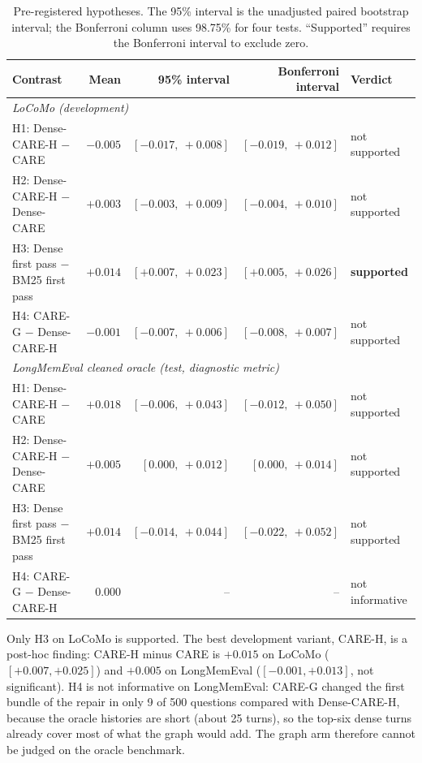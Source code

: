 \documentclass[10pt]{article}
\theoremstyle{plain}
\begin{document}
\begin{table}[t]
\centering
\caption{Pre-registered hypotheses. The 95\% interval is the unadjusted paired bootstrap interval; the Bonferroni
column uses 98.75\% for four tests. ``Supported'' requires the Bonferroni interval to exclude zero.}
\label{tab:hyp}
\small
\begin{tabular}{lrrrl}
\toprule
Contrast & Mean & 95\% interval & Bonferroni interval & Verdict \\
\midrule
\multicolumn{5}{l}{\emph{LoCoMo (development)}} \\
H1: Dense-CARE-H $-$ CARE & $-0.005$ & $[-0.017,\ +0.008]$ & $[-0.019,\ +0.012]$ & not supported \\
H2: Dense-CARE-H $-$ Dense-CARE & $+0.003$ & $[-0.003,\ +0.009]$ & $[-0.004,\ +0.010]$ & not supported \\
H3: Dense first pass $-$ BM25 first pass & $+0.014$ & $[+0.007,\ +0.023]$ & $[+0.005,\ +0.026]$ & \textbf{supported} \\
H4: CARE-G $-$ Dense-CARE-H & $-0.001$ & $[-0.007,\ +0.006]$ & $[-0.008,\ +0.007]$ & not supported \\
\midrule
\multicolumn{5}{l}{\emph{LongMemEval cleaned oracle (test, diagnostic metric)}} \\
H1: Dense-CARE-H $-$ CARE & $+0.018$ & $[-0.006,\ +0.043]$ & $[-0.012,\ +0.050]$ & not supported \\
H2: Dense-CARE-H $-$ Dense-CARE & $+0.005$ & $[0.000,\ +0.012]$ & $[0.000,\ +0.014]$ & not supported \\
H3: Dense first pass $-$ BM25 first pass & $+0.014$ & $[-0.014,\ +0.044]$ & $[-0.022,\ +0.052]$ & not supported \\
H4: CARE-G $-$ Dense-CARE-H & $0.000$ & -- & -- & not informative \\
\bottomrule
\end{tabular}
\end{table}

Only H3 on LoCoMo is supported. The best development variant, CARE-H, is a post-hoc finding: CARE-H minus
CARE is $+0.015$ on LoCoMo ($[+0.007,+0.025]$) and $+0.005$ on LongMemEval ($[-0.001,+0.013]$, not
significant). H4 is not informative on LongMemEval: CARE-G changed the first bundle of the repair in only
9 of 500 questions compared with Dense-CARE-H, because the oracle histories are short (about 25 turns), so the
top-six dense turns already cover most of what the graph would add. The graph arm therefore cannot be
judged on the oracle benchmark.
\end{document}
